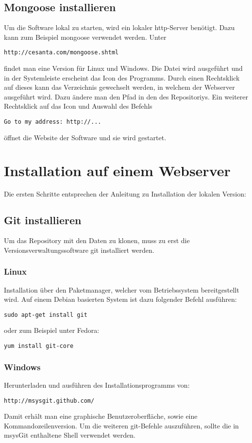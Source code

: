 \documentclass[11pt,a4paper]{article}
\begin{document}
\subsection{Mongoose installieren}
Um die Software lokal zu starten, wird ein lokaler http-Server benötigt. Dazu kann zum Beispiel mongoose verwendet werden.
Unter 
\begin{lstlisting}
http://cesanta.com/mongoose.shtml
\end{lstlisting}
findet man eine Version für Linux und Windows.
Die Datei wird ausgeführt und in der Systemleiste erscheint das Icon des Programms.
Durch einen Rechtsklick auf dieses kann das Verzeichnis gewechselt werden, in welchem der Webserver ausgeführt wird. 
Dazu ändere man den Pfad in den des Repositoriys.
Ein weiterer Rechtsklick auf das Icon und Auswahl des Befehls
\begin{lstlisting}
Go to my address: http://...
\end{lstlisting}
öffnet die Website der Software und sie wird gestartet.
\section{Installation auf einem Webserver}
Die ersten Schritte entsprechen der Anleitung zu Installation der lokalen Version:
\subsection{Git installieren}
Um das Repository mit den Daten zu klonen, muss zu erst die Versionsverwaltungssoftware git installiert werden.
\subsubsection{Linux}
Installation über den Paketmanager, welcher vom Betriebssystem bereitgestellt wird.
Auf einem Debian basierten System ist dazu folgender Befehl ausführen:
\begin{lstlisting}
sudo apt-get install git
\end{lstlisting}
oder zum Beispiel unter Fedora:
\begin{lstlisting}
yum install git-core
\end{lstlisting}
\subsubsection{Windows}
Herunterladen und ausführen des Installationsprogramms von:
\begin{lstlisting}
http://msysgit.github.com/
\end{lstlisting}
Damit erhält man eine graphische Benutzeroberfläche, sowie eine Kommandozeilenversion.
Um die weiteren git-Befehle auszuführen, sollte die in msysGit enthaltene Shell verwendet werden.
\end{document}
